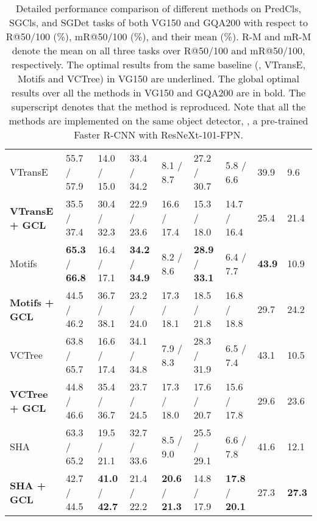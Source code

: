\documentclass[10pt,twocolumn,letterpaper]{article}
\begin{document}
{\begin{table*}[t]
\begin{tabular}{p{3.2cm}|p{1.4cm}<{\centering}p{1.4cm}<{\centering}|p{1.4cm}<{\centering}p{1.4cm}<{\centering}|p{1.4cm}<{\centering}p{1.4cm}<{\centering}|p{0.5cm}<{\centering}p{0.5cm}}
		VTransE & 55.7 / 57.9 & 14.0 / 15.0 & 33.4 / 34.2 & 8.1 / 8.7 & 27.2 / 30.7 & 5.8 / 6.6 & 39.9 & 9.6 \\ 
		\textbf{VTransE + GCL} & 35.5 / 37.4 & 30.4 / 32.3 & 22.9 / 23.6 & 16.6 / 17.4 & 15.3 / 18.0 & 14.7 / 16.4 & 25.4 & 21.4 \\
		\hline
		
		Motifs & \textbf{65.3} / \textbf{66.8} & 16.4 / 17.1 & \textbf{34.2} / \textbf{34.9} & 8.2 / 8.6 & \textbf{28.9} / \textbf{33.1} & 6.4 / 7.7 & \textbf{43.9} & 10.9 \\ 
		\textbf{Motifs + GCL} & 44.5 / 46.2 & 36.7 / 38.1 & 23.2 / 24.0 & 17.3 / 18.1 & 18.5 / 21.8 & 16.8 / 18.8 & 29.7 & 24.2 \\
		\hline
		
		VCTree & 63.8 / 65.7 & 16.6 / 17.4 & 34.1 / 34.8 & 7.9 / 8.3 & 28.3 / 31.9 & 6.5 / 7.4 & 43.1 & 10.5 \\
		\textbf{VCTree + GCL} & 44.8 / 46.6 & 35.4 / 36.7 & 23.7 / 24.5 & 17.3 / 18.0 & 17.6 / 20.7 & 15.6 / 17.8 & 29.6 & 23.6 \\
		 \hline
		 
		SHA & 63.3 / 65.2 & 19.5 / 21.1 & 32.7 / 33.6 & 8.5 / 9.0 & 25.5 / 29.1 & 6.6 / 7.8 & 41.6 & 12.1 \\
		\textbf{SHA + GCL} & 42.7 / 44.5 & \textbf{41.0} / \textbf{42.7} & 21.4 / 22.2 & \textbf{20.6} / \textbf{21.3} & 14.8 / 17.9 & \textbf{17.8} / \textbf{20.1} & 27.3 & \textbf{27.3} \\
		 \hline
		
		
	\end{tabular}
	\caption{Detailed performance comparison of different methods on PredCls, SGCls, and SGDet tasks of both VG150 and GQA200 with respect to R@50/100 (\%), mR@50/100 (\%), and their mean (\%). R-M and mR-M denote the mean on all three tasks over R@50/100 and mR@50/100, respectively. The optimal results from the same baseline (\ie, VTransE, Motifs and VCTree) in VG150 are underlined. The global optimal results over all the methods in VG150 and GQA200 are in bold. The superscript  denotes that the method is reproduced. Note that all the methods are implemented on the same object detector, \ie, a pre-trained Faster R-CNN with ResNeXt-101-FPN.}
	\label{result_all}
\end{table*}

}
\end{document}
